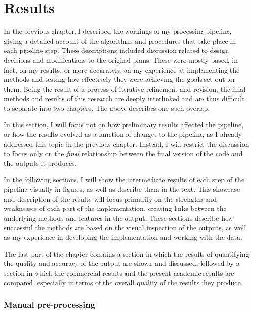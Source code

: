 
\chapter{Results}
\label{chap:r}

In the previous chapter, I described the workings of my processing pipeline, giving a detailed account of the algorithms and procedures that take place in each pipeline step. These descriptions included discussion related to design decisions and modifications to the original plans. These were mostly based, in fact, on my results, or more accurately, on my experience at implementing the methods and testing how effectively they were achieving the goals set out for them. Being the result of a process of iterative refinement and revision, the final methods and results of this research are deeply interlinked and are thus difficult to separate into two chapters. The above describes one such overlap.

In this section, I will focus not on how preliminary results affected the pipeline, or how the results evolved as a function of changes to the pipeline, as I already addressed this topic in the previous chapter. Instead, I will restrict the discussion to focus only on the \textit{final} relationship between the final version of the code and the outputs it produces.

In the following sections, I will show the intermediate results of each step of the pipeline visually in figures, as well as describe them in the text. This showcase and description of the results will focus primarily on the strengths and weaknesses of each part of the implementation, creating links between the underlying methods and features in the output. These sections describe how successful the methods are based on the visual inspection of the outputs, as well as my experience in developing the implementation and working with the data.

The last part of the chapter contains a section in which the results of quantifying the quality and accuracy of the output are shown and discussed, followed by a section in which the commercial results and the present academic results are compared, especially in terms of the overall quality of the results they produce.

\subsection{Manual pre-processing}
\label{sub:manualpreprocessing}

